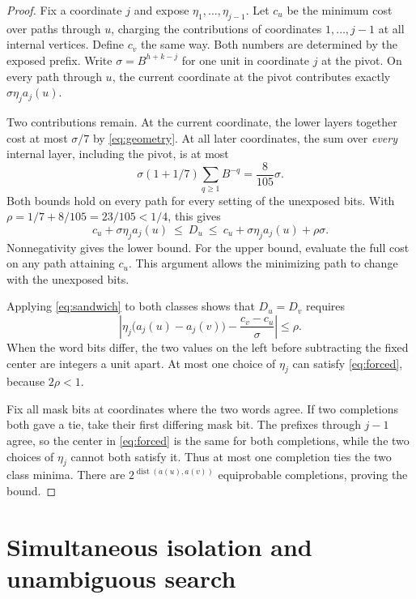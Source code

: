 \documentclass[11pt]{article}
\newcommand{\dist}{\operatorname{dist}}
\begin{document}
\begin{proof}
Fix a coordinate $j$ and expose $\eta_1,\ldots,\eta_{j-1}$.
Let $c_u$ be the minimum cost over paths through $u$, charging the
contributions of coordinates $1,\ldots,j-1$ at all internal vertices.
Define $c_v$ the same way. Both numbers are determined by the exposed
prefix. Write $\sigma=B^{h+k-j}$ for one unit in coordinate $j$ at
the pivot. On every path through $u$, the current coordinate at the
pivot contributes exactly $\sigma\eta_j a_j(u)$.

Two contributions remain. At the current coordinate, the lower layers
together cost at most $\sigma/7$ by \eqref{eq:geometry}. At all later
coordinates, the sum over \emph{every} internal layer, including the
pivot, is at most
\[
      \sigma(1+1/7)\sum_{q\ge1}B^{-q}=\frac{8}{105}\sigma .
\]
Both bounds hold on every path for every setting of the unexposed bits.
With $\rho=1/7+8/105=23/105<1/4$, this gives
\begin{equation}\label{eq:sandwich}
  c_u+\sigma\eta_j a_j(u)\ \le\ D_u\
            \le\ c_u+\sigma\eta_j a_j(u)+\rho\sigma .
\end{equation}
Nonnegativity gives the lower bound. For the upper bound, evaluate the
full cost on any path attaining $c_u$. This argument allows the
minimizing path to change with the unexposed bits.

Applying \eqref{eq:sandwich} to both classes shows that $D_u=D_v$
requires
\begin{equation}\label{eq:forced}
   \left|\eta_j\bigl(a_j(u)-a_j(v)\bigr)
              -\frac{c_v-c_u}{\sigma}\right|\le\rho .
\end{equation}
When the word bits differ, the two values on the left before subtracting
the fixed center are integers a unit apart. At most one choice of
$\eta_j$ can satisfy \eqref{eq:forced}, because $2\rho<1$.

Fix all mask bits at coordinates where the two words agree. If two
completions both gave a tie, take their first differing mask bit.
The prefixes through $j-1$ agree, so the center in \eqref{eq:forced}
is the same for both completions, while the two choices of $\eta_j$
cannot both satisfy it. Thus at most one completion ties the two
class minima. There are $2^{\dist(a(u),a(v))}$ equiprobable
completions, proving the bound.
\end{proof}

\section{Simultaneous isolation and unambiguous search}
\end{document}
